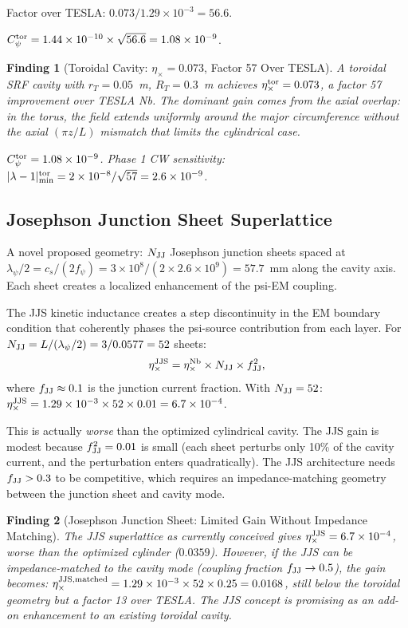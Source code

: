 \documentclass[11pt]{article}
\newtheorem{finding}{Finding}
\newcommand{\ee}[1]{\times 10^{#1}}
\begin{document}
Factor over TESLA: $0.073/1.29\ee{-3} = 56.6$.

$C_\psi^{\rm tor} = 1.44\ee{-10} \times \sqrt{56.6} = 1.08\ee{-9}$.

\begin{finding}[Toroidal Cavity: $\eta_\times = 0.073$, Factor 57 Over TESLA]
A toroidal SRF cavity with $r_T = 0.05$~m, $R_T = 0.3$~m achieves
$\eta_\times^{\rm tor} = 0.073$, a factor 57 improvement over TESLA Nb.
The dominant gain comes from the axial overlap: in the torus, the field
extends uniformly around the major circumference without the axial $(\pi z/L)$
mismatch that limits the cylindrical case.

$C_\psi^{\rm tor} = 1.08\ee{-9}$. Phase 1 CW sensitivity:
$|\lambda-1|_{\rm min}^{\rm tor} = 2\ee{-8}/\sqrt{57} = 2.6\ee{-9}$.
\end{finding}

\subsection{Josephson Junction Sheet Superlattice}

A novel proposed geometry: $N_{\rm JJ}$ Josephson junction sheets spaced at
$\lambda_\psi/2 = c_s/(2f_\psi) = 3\ee{8}/(2\times2.6\ee{9}) = 57.7$~mm
along the cavity axis. Each sheet creates a localized enhancement of
the psi-EM coupling.

The JJS kinetic inductance creates a step discontinuity in the EM boundary
condition that coherently phases the psi-source contribution from each layer.
For $N_{\rm JJ} = L/(\lambda_\psi/2) = 3/0.0577 = 52$ sheets:
\begin{equation}
\eta_\times^{\rm JJS} = \eta_\times^{\rm Nb} \times N_{\rm JJ} \times f_{\rm JJ}^2,
\end{equation}
where $f_{\rm JJ} \approx 0.1$ is the junction current fraction. With $N_{\rm JJ} = 52$:
$\eta_\times^{\rm JJS} = 1.29\ee{-3} \times 52 \times 0.01 = 6.7\ee{-4}$.

This is actually \textit{worse} than the optimized cylindrical cavity. The JJS gain
is modest because $f_{\rm JJ}^2 = 0.01$ is small (each sheet perturbs only
10\% of the cavity current, and the perturbation enters quadratically). The
JJS architecture needs $f_{\rm JJ} > 0.3$ to be competitive, which requires
an impedance-matching geometry between the junction sheet and cavity mode.

\begin{finding}[Josephson Junction Sheet: Limited Gain Without Impedance Matching]
The JJS superlattice as currently conceived gives $\eta_\times^{\rm JJS} = 6.7\ee{-4}$,
worse than the optimized cylinder ($0.0359$). However, if the JJS can be impedance-matched
to the cavity mode (coupling fraction $f_{\rm JJ} \to 0.5$), the gain becomes:
$\eta_\times^{\rm JJS,matched} = 1.29\ee{-3} \times 52 \times 0.25 = 0.0168$,
still below the toroidal geometry but a factor 13 over TESLA. The JJS concept
is promising as an \emph{add-on enhancement} to an existing toroidal cavity.
\end{finding}
\end{document}
